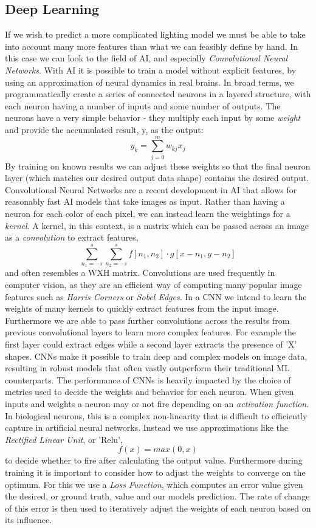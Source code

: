\documentclass[ %
                    author={Gavin Parker},
                supervisor={Dr. Neill Campbell},
                    degree={MEng},
                     title={Deep Siamese Networks for Illumination Estimation from Stereo Images},
                  subtitle={},
                      type={Research},
                      year={2018} ]{dissertation}
\begin{document}
\subsection{Deep Learning}
If we wish to predict a more complicated lighting model we must be able to take into account many more features than what we can feasibly define by hand. In this case we can look to the field of AI, and especially \textit{Convolutional Neural Networks}. With AI it is possible to train a model without explicit features, by using an approximation of neural dynamics in real brains. In broad terms, we programmatically create a series of connected neurons in a layered structure, with each neuron having a number of inputs and some number of outputs. The neurons have a very simple behavior - they multiply each input by some \textit{weight} and provide the accumulated result, y, as the output:
\[y_k = \sum_{j=0}^{m}{w_{kj}x_j}\]
By training on known results we can adjust these weights so that the final neuron layer (which matches our desired output data shape) contains the desired output.
\newline
Convolutional Neural Networks are a recent development in AI that allows for reasonably fast AI models that take images as input. Rather than having a neuron for each color of each pixel, we can instead learn the weightings for a \textit{kernel}. A kernel, in this context, is a matrix which can be passed across an image as a \textit{convolution} to extract features,
\[\sum_{n_1=-s}^{s}{\sum_{n_2=-s}^{s}{f[n_1, n_2]\cdot g[x-n_1,y-n_2]}} \]
and often resembles a WXH matrix. Convolutions are used frequently in computer vision, as they are an efficient way of computing many popular image features such as \textit{Harris Corners} or \textit{Sobel Edges}. In a CNN we intend to learn the weights of many kernels to quickly extract features from the input image. Furthermore we are able to pass further convolutions across the results from previous convolutional layers to learn more complex features. For example the first layer could extract edges while a second layer extracts the presence of 'X' shapes. CNNs make it possible to train deep and complex models on image data, resulting in robust models that often vastly outperform their traditional ML counterparts.
\newline
The performance of CNNs is heavily impacted by the choice of metrics used to decide the weights and behavior for each neuron. When given inputs and weights a neuron may or not fire depending on an \textit{activation function}. In biological neurons, this is a complex non-linearity that is difficult to efficiently capture in artificial neural networks. Instead we use approximations like the \textit{Rectified Linear Unit}, or 'Relu',
\[f(x) = max(0,x)\]
to decide whether to fire after calculating the output value. Furthermore during training it is important to consider how to adjust the weights to converge on the optimum. For this we use a \textit{Loss Function}, which computes an error value given the desired, or ground truth, value and our models prediction. The rate of change of this error is then used to iteratively adjust the weights of each neuron based on its influence.
\end{document}
